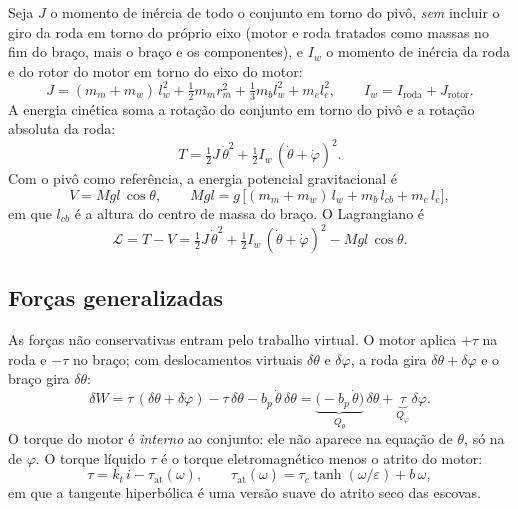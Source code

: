 \documentclass[11pt,a4paper]{article}
\begin{document}
Seja $J$ o momento de inércia de todo o conjunto em torno do pivô, \emph{sem} incluir o
giro da roda em torno do próprio eixo (motor e roda tratados como massas no fim do braço,
mais o braço e os componentes), e $I_w$ o momento de inércia da roda e do rotor do motor
em torno do eixo do motor:
\begin{equation}
  J = (m_m + m_w)\,l_w^2 + \tfrac12 m_m r_m^2 + \tfrac13 m_b l_w^2 + m_e l_e^2 ,
  \qquad
  I_w = I_{\text{roda}} + J_{\text{rotor}} .
\end{equation}
A energia cinética soma a rotação do conjunto em torno do pivô e a rotação absoluta
da roda:
\begin{equation}
  T = \tfrac12 J\,\dot\theta^2 + \tfrac12 I_w\,(\dot\theta + \dot\varphi)^2 .
  \label{eq:T}
\end{equation}
Com o pivô como referência, a energia potencial gravitacional é
\begin{equation}
  V = Mgl\,\cos\theta ,
  \qquad
  Mgl = g\,\bigl[(m_m + m_w)\,l_w + m_b\,l_{cb} + m_e\,l_e\bigr] ,
  \label{eq:V}
\end{equation}
em que $l_{cb}$ é a altura do centro de massa do braço. O Lagrangiano é
\begin{equation}
  \mathcal{L} = T - V
  = \tfrac12 J\,\dot\theta^2 + \tfrac12 I_w\,(\dot\theta + \dot\varphi)^2 - Mgl\,\cos\theta .
\end{equation}

\subsection{Forças generalizadas}

As forças não conservativas entram pelo trabalho virtual. O motor aplica $+\tau$ na roda
e $-\tau$ no braço; com deslocamentos virtuais $\delta\theta$ e $\delta\varphi$, a roda gira
$\delta\theta + \delta\varphi$ e o braço gira $\delta\theta$:
\begin{equation}
  \delta W = \tau\,(\delta\theta + \delta\varphi) - \tau\,\delta\theta - b_p\,\dot\theta\,\delta\theta
           = \underbrace{\bigl(-b_p\,\dot\theta\bigr)}_{Q_\theta}\,\delta\theta
           + \underbrace{\tau}_{Q_\varphi}\,\delta\varphi .
\end{equation}
O torque do motor é \emph{interno} ao conjunto: ele não aparece na equação de $\theta$, só na
de $\varphi$. O torque líquido $\tau$ é o torque eletromagnético menos o atrito do motor:
\begin{equation}
  \tau = k_t\, i - \tau_{\text{at}}(\omega),
  \qquad
  \tau_{\text{at}}(\omega) = \tau_c \tanh(\omega/\varepsilon) + b\,\omega ,
  \label{eq:tau}
\end{equation}
em que a tangente hiperbólica é uma versão suave do atrito seco das escovas.
\end{document}
